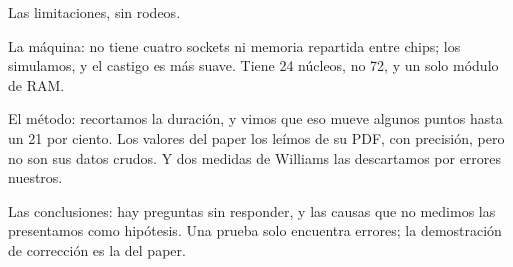 Las limitaciones, sin rodeos.

La máquina: no tiene cuatro sockets ni memoria repartida entre chips; los simulamos, y el castigo es más suave. Tiene 24 núcleos, no 72, y un solo módulo de RAM.

El método: recortamos la duración, y vimos que eso mueve algunos puntos hasta un 21 por ciento. Los valores del paper los leímos de su PDF, con precisión, pero no son sus datos crudos. Y dos medidas de Williams las descartamos por errores nuestros.

Las conclusiones: hay preguntas sin responder, y las causas que no medimos las presentamos como hipótesis. Una prueba solo encuentra errores; la demostración de corrección es la del paper.
